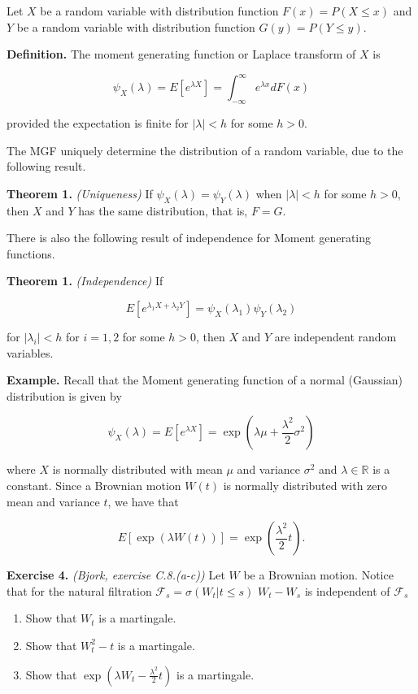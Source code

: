 \documentclass[a4paper,12pt,openany]{book}
\providecommand{\tightlist}{%
 \setlength{\itemsep}{0pt}\setlength{\parskip}{0pt}}
\begin{document}
Let \(X\) be a random variable with distribution function \(F(x)=P(X\le x)\) and \(Y\) be a random variable with distribution function \(G(y)=P(Y\le y)\).

\textbf{Definition.} The moment generating function or Laplace transform of \(X\) is

\[
\psi_X(\lambda)=E\left[e^{\lambda X}\right]=\int_{-\infty}^\infty e^{\lambda x}dF(x)
\]

provided the expectation is finite for \(\vert\lambda\vert<h\) for some \(h>0\).

The MGF uniquely determine the distribution of a random variable, due to the following result.

\textbf{Theorem 1.} \emph{(Uniqueness)} If \(\psi_X(\lambda)=\psi_Y(\lambda)\) when \(\vert\lambda\vert<h\) for some \(h>0\), then \(X\) and \(Y\) has the same distribution, that is, \(F=G\).

There is also the following result of independence for Moment generating functions.

\textbf{Theorem 1.} \emph{(Independence)} If

\[
E\left[e^{\lambda_1X+\lambda_2Y}\right]=\psi_X(\lambda_1)\psi_Y(\lambda_2)
\]

for \(\vert\lambda_i\vert<h\) for \(i=1,2\) for some \(h>0\), then \(X\) and \(Y\) are independent random variables.

\textbf{Example.} Recall that the Moment generating function of a normal (Gaussian) distribution is given by

\[
\psi_X(\lambda)=E\left[e^{\lambda X}\right]=\exp\left(\lambda \mu + \frac{\lambda^2}{2}\sigma^2\right)
\]

where \(X\) is normally distributed with mean \(\mu\) and variance \(\sigma^2\) and \(\lambda\in\mathbb{R}\) is a constant. Since a Brownian motion \(W(t)\) is normally distributed with zero mean and variance \(t\), we have that

\[
E[\exp(\lambda W(t))]=\exp\left(\frac{\lambda^2}{2}t\right).
\]

\textbf{Exercise 4.} \emph{(Bjork, exercise C.8.(a-c))} Let \(W\) be a Brownian motion. Notice that for the natural filtration \(\mathcal{F}_s=\sigma(W_t\vert t\le s)\) \(W_t-W_s\) is independent of \(\mathcal{F}_s\)

\begin{enumerate}
\def\labelenumi{\alph{enumi}.}
\tightlist
\item
  Show that \(W_t\) is a martingale.
\item
  Show that \(W^2_t-t\) is a martingale.
\item
  Show that \(\exp(\lambda W_t-\frac{\lambda^2}{2}t)\) is a martingale.
\end{enumerate}
\end{document}
